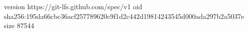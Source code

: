 version https://git-lfs.github.com/spec/v1
oid sha256:195da66cbc36acf257789620c9f1d2c442d19814243545d000ada297b2a5037e
size 87544
